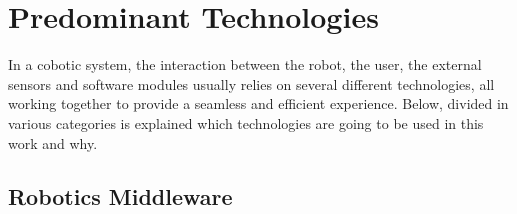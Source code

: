 \section{Predominant Technologies}

\par In a cobotic system, the interaction between the robot, the user, the external sensors and software modules usually relies on several different technologies, all working together to provide a seamless and efficient experience. Below, divided in various categories is explained which technologies are going to be used in this work and why. 

\subsection{Robotics Middleware}

